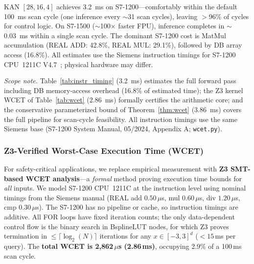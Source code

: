 \documentclass[journal,onecolumn]{IEEEtran}
\begin{document}
KAN $[28,16,4]$ achieves 3.2~ms on S7-1200---comfortably within the
default 100~ms scan cycle (one inference every $\sim$31 scan cycles), leaving
$>$96\% of cycles for control logic. On S7-1500 ($\sim$100$\times$ faster FPU),
inference completes in $\sim$0.03~ms within a single scan cycle. The dominant
S7-1200 cost is MatMul accumulation (REAL ADD: 42.8\%, REAL MUL: 29.1\%),
followed by DB array access (16.8\%). All estimates use the Siemens
instruction timings for S7-1200 CPU~1211C V4.7~\cite{siemens_s7_1200_2022};
physical hardware may differ.


\vspace{2pt}
\noindent\textit{Scope note.} Table~\ref{tab:instr_timing} (3.2~ms) estimates the full forward pass including DB memory-access overhead (16.8\% of estimated time); the Z3 kernel WCET of Table~\ref{tab:wcet} (2.86~ms) formally certifies the arithmetic core; and the conservative parameterized bound of Theorem~\ref{thm:wcet} (3.86~ms) covers the full pipeline for scan-cycle feasibility. All instruction timings use the same Siemens base (S7-1200 System Manual, 05/2024, Appendix A; \texttt{wcet.py}).

\subsubsection{Z3-Verified Worst-Case Execution Time (WCET)}
\label{sec:z3_wcet}

For safety-critical applications, we replace empirical measurement with
\textbf{Z3 SMT-based WCET analysis}---a \emph{formal} method proving
execution time bounds for \emph{all} inputs. We model S7-1200 CPU~1211C
at the instruction level using nominal timings from the Siemens manual
\cite{siemens_s7_1200_2022} (REAL add $0.50\,\mu$s, mul $0.60\,\mu$s, div
$1.20\,\mu$s, cmp $0.30\,\mu$s). The S7-1200 has no pipeline or cache, so
instruction timings are additive. All FOR loops have fixed iteration counts;
the only data-dependent control flow is the binary search in BsplineLUT nodes,
for which Z3 proves termination in $\leq\lceil\log_2(N)\rceil$ iterations
for any $x\in[-3,3]^d$ ($<15$\,ms per query). The \textbf{total WCET is
2,862\,$\mu$s (2.86\,ms)}, occupying 2.9\% of a 100\,ms scan cycle.
\end{document}
